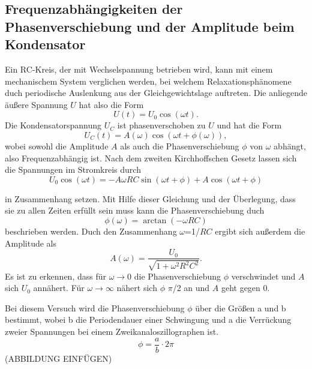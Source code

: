 \subsection{Frequenzabhängigkeiten der Phasenverschiebung und der Amplitude beim Kondensator}
Ein RC-Kreis, der mit Wechselspannung betrieben wird,
kann mit einem mechanischem System verglichen werden,
bei welchem Relaxationsphänomene duch periodische
Auslenkung aus der Gleichgewichtslage auftreten.
Die anliegende äußere Spannung $U$ hat also die Form
\begin{equation}
    U(t)=U_0 \cos (\omega t).
\end{equation}
\noindent Die Kondensatorspannung $U_C$ ist
phasenverschoben zu $U$ und hat die Form
\begin{equation}
    U_C(t)=A(\omega) \cos (\omega t + \phi(\omega)),
\end{equation}
\noindent wobei sowohl die Amplitude $A$ als auch
die Phasenverschiebung $\phi$ von $\omega$
abhängt, also Frequenzabhängig ist. Nach dem zweiten
Kirchhoffschen Gesetz lassen sich die Spannungen
im Stromkreis durch
\begin{equation}
    U_0 \cos (\omega t)=-A\omega RC \sin (\omega t + \phi)+A \cos (\omega t+\phi)
    \label{eq:a}
\end{equation}

\noindent in Zusammenhang setzen. Mit Hilfe dieser
Gleichung und der Überlegung, dass sie zu allen Zeiten 
erfüllt sein muss kann die Phasenverschiebung duch
\begin{equation}
    \phi (\omega)= \arctan (-\omega RC)
\end{equation}
\noindent beschrieben werden. Duch den Zusammenhang
$\omega$=1/$RC$ ergibt sich außerdem die Amplitude als
\begin{equation}
    A(\omega)=\frac{U_0}{\sqrt{1+\omega^2 R^2 C^2}}.
\end{equation}
\noindent Es ist zu erkennen, dass für
$\omega \to 0$ die Phasenverschiebung $\phi$ verschwindet
und $A$ sich $U_0$ annähert. Für $\omega \to \infty$
nähert sich $\phi$ $\pi$/2 an und $A$ geht gegen 0.

Bei diesem Versuch wird die Phasenverschiebung $\phi$
über die Größen a und b bestimmt, wobei b die Periodendauer
einer Schwingung und a die Verrückung zweier Spannungen
bei einem Zweikanaloszillographen ist.
\begin{equation}
    \phi=\frac{a}{b}\cdot2\pi
\end{equation}
(ABBILDUNG EINFÜGEN)

